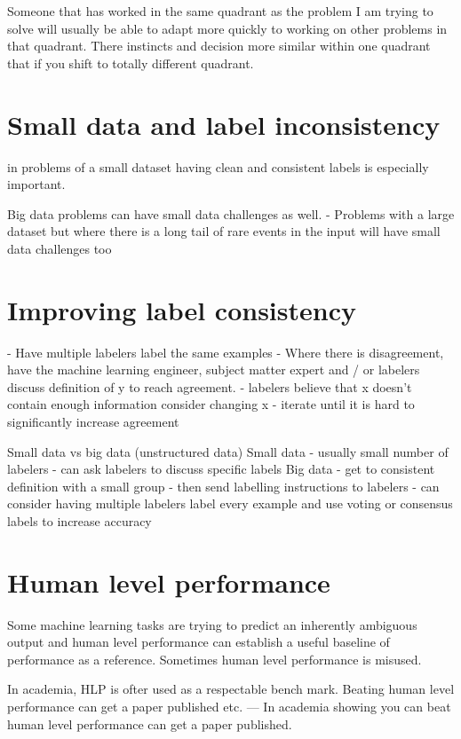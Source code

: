 Someone that has worked in the same quadrant as the problem I am trying to solve will usually be able to adapt more quickly to working on other problems in that quadrant.
There instincts and decision more similar within one quadrant that if you shift to totally different quadrant.

\section{Small data and label inconsistency}

in problems of a small dataset having clean and consistent labels is especially important.

Big data problems can have small data challenges as well.
- Problems with a large dataset but where there is a long tail of rare events in the input will have small data challenges too

\section{Improving label consistency}

- Have multiple labelers label the same examples
- Where there is disagreement, have the machine learning engineer, subject matter expert and / or labelers discuss definition of y to reach agreement.
- labelers believe that x doesn't contain enough information consider changing x
- iterate until it is hard to significantly increase agreement


Small data vs big data (unstructured data)
Small data
- usually small number of labelers
- can ask labelers to discuss specific labels
Big data
- get to consistent definition with a small group
- then send labelling instructions to labelers
- can consider having multiple labelers label every example and use voting or consensus labels to increase accuracy

\section{Human level performance}
Some machine learning tasks are trying to predict an inherently ambiguous output and human level performance can establish a useful baseline of performance as a reference.
Sometimes human level performance is misused.

In academia, HLP is ofter used as a respectable bench mark.
Beating human level performance can get a paper published etc.
--- In academia showing you can beat human level performance can get a paper published.


